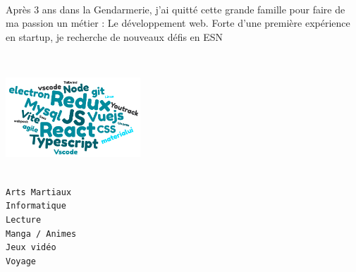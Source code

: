 \documentclass[lighthipster]{main-classes}
\begin{document}
\begin{paracol}{2}
    
    \paracolbackgroundoptions
    
    \footnotesize
    {\setasidefontcolour
    \flushright
    \begin{center}
    \end{center}
    
    \\[0.5em]
    
    {Après 3 ans dans la Gendarmerie, j'ai quitté cette grande famille pour faire de ma passion un métier : Le développement web. Forte d'une première expérience en startup, je recherche de nouveaux défis en ESN}

    \vspace{1em}
    
    \bigskip
    \\[0.5em]
        \centerline{\includegraphics[height=3cm]{images/nuage-de-mots.png}}
    \bigskip

    \vspace{1em}
    
    \\[0.5em]
    
    \texttt{Arts Martiaux} \\
    \vspace{0.25em}
    \texttt{Informatique} \\
    \vspace{0.25em}
    \texttt{Lecture} \\
    \vspace{0.25em}
    \texttt{Manga / Animes} \\
    \vspace{0.25em}
    \texttt{Jeux vidéo} \\
    \vspace{0.25em}
    \texttt{Voyage}
    \bigskip
    
    \vspace{1em}
    
    \\[0.5em]
    \vspace{1em}
    
}
\end{paracol}
\end{document}
